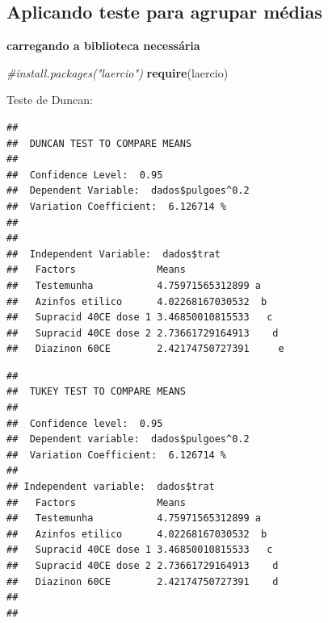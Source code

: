 \documentclass[
]{book}
\newenvironment{Shaded}{\begin{snugshade}}{\end{snugshade}}
\newcommand{\CommentTok}[1]{\textcolor[rgb]{0.56,0.35,0.01}{\textit{#1}}}
\newcommand{\KeywordTok}[1]{\textcolor[rgb]{0.13,0.29,0.53}{\textbf{#1}}}
\newcommand{\NormalTok}[1]{#1}
\newcommand{\StringTok}[1]{\textcolor[rgb]{0.31,0.60,0.02}{#1}}
\begin{document}
\hypertarget{aplicando-teste-para-agrupar-muxe9dias}{%
\subsection{Aplicando teste para agrupar médias}\label{aplicando-teste-para-agrupar-muxe9dias}}

\textbf{carregando a biblioteca necessária}

\begin{Shaded}
\begin{Highlighting}[]
\CommentTok{#install.packages("laercio")}
\KeywordTok{require}\NormalTok{(laercio)}
\end{Highlighting}
\end{Shaded}

Teste de Duncan:

\begin{Shaded}
\end{Shaded}

\begin{verbatim}
## 
##  DUNCAN TEST TO COMPARE MEANS 
##  
##  Confidence Level:  0.95 
##  Dependent Variable:  dados$pulgoes^0.2
##  Variation Coefficient:  6.126714 % 
##  
## 
##  Independent Variable:  dados$trat 
##   Factors              Means                 
##   Testemunha           4.75971565312899 a    
##   Azinfos etilico      4.02268167030532  b   
##   Supracid 40CE dose 1 3.46850010815533   c  
##   Supracid 40CE dose 2 2.73661729164913    d 
##   Diazinon 60CE        2.42174750727391     e
\end{verbatim}

\begin{Shaded}
\end{Shaded}

\begin{verbatim}
## 
##  TUKEY TEST TO COMPARE MEANS 
##  
##  Confidence level:  0.95 
##  Dependent variable:  dados$pulgoes^0.2
##  Variation Coefficient:  6.126714 % 
##  
## Independent variable:  dados$trat 
##   Factors              Means                
##   Testemunha           4.75971565312899 a   
##   Azinfos etilico      4.02268167030532  b  
##   Supracid 40CE dose 1 3.46850010815533   c 
##   Supracid 40CE dose 2 2.73661729164913    d
##   Diazinon 60CE        2.42174750727391    d
## 
## 
\end{verbatim}
\end{document}
